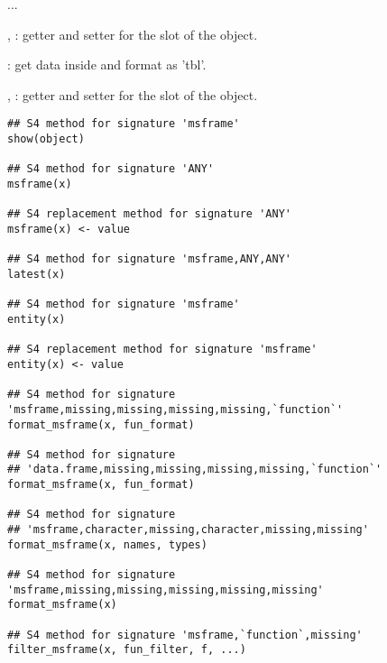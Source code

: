 \documentclass[letterpaper]{book}
\begin{document}
%
\begin{Description}\relax
...

, : getter and setter
for the  slot of the object.

: get data inside  and format as
'tbl'.

, : getter and setter
for the  slot of the object.
\end{Description}
%
\begin{Usage}
\begin{verbatim}
## S4 method for signature 'msframe'
show(object)

## S4 method for signature 'ANY'
msframe(x)

## S4 replacement method for signature 'ANY'
msframe(x) <- value

## S4 method for signature 'msframe,ANY,ANY'
latest(x)

## S4 method for signature 'msframe'
entity(x)

## S4 replacement method for signature 'msframe'
entity(x) <- value

## S4 method for signature 'msframe,missing,missing,missing,missing,`function`'
format_msframe(x, fun_format)

## S4 method for signature 
## 'data.frame,missing,missing,missing,missing,`function`'
format_msframe(x, fun_format)

## S4 method for signature 
## 'msframe,character,missing,character,missing,missing'
format_msframe(x, names, types)

## S4 method for signature 'msframe,missing,missing,missing,missing,missing'
format_msframe(x)

## S4 method for signature 'msframe,`function`,missing'
filter_msframe(x, fun_filter, f, ...)
\end{verbatim}
\end{Usage}
\end{document}
